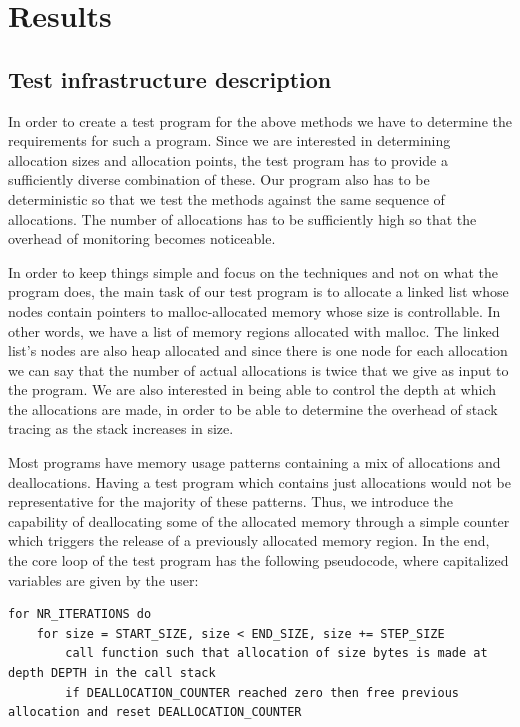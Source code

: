 \chapter{Results}
\label{chapter:results}

\section{Test infrastructure description}
\label{section:testprogram}

In order to create a test program for the above methods we have to determine the requirements for such a program. Since we are interested in determining allocation sizes and allocation points, the test program has to provide a sufficiently diverse combination of these. Our program also has to be deterministic so that we test the methods against the same sequence of allocations. The number of allocations has to be sufficiently high so that the overhead of monitoring becomes noticeable.

In order to keep things simple and focus on the techniques and not on what the program does, the main task of our test program is to allocate a linked list whose nodes contain pointers to malloc-allocated memory whose size is controllable. In other words, we have a list of memory regions allocated with malloc. The linked list's nodes are also heap allocated and since there is one node for each allocation we can say that the number of actual allocations is twice that we give as input to the program. We are also interested in being able to control the depth at which the allocations are made, in order to be able to determine the overhead of stack tracing as the stack increases in size.

Most programs have memory usage patterns containing a mix of allocations and deallocations. Having a test program which contains just allocations would not be representative for the majority of these patterns. Thus, we introduce the capability of deallocating some of the allocated memory through a simple counter which triggers the release of a previously allocated memory region. In the end, the core loop of the test program has the following pseudocode, where capitalized variables are given by the user:

\newpage

\begin{lstlisting}[label=pseudotest, caption=Test program core loop]
for NR_ITERATIONS do
	for size = START_SIZE, size < END_SIZE, size += STEP_SIZE
		call function such that allocation of size bytes is made at depth DEPTH in the call stack
		if DEALLOCATION_COUNTER reached zero then free previous allocation and reset DEALLOCATION_COUNTER
\end{lstlisting}

